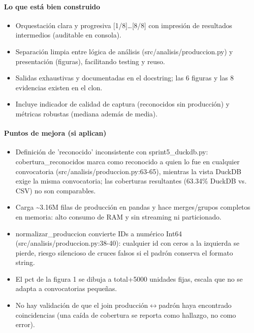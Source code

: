 \paragraph{Lo que está bien construido}
\begin{itemize}
  \item Orquestación clara y progresiva [1/8]\dots{}[8/8] con impresión de resultados intermedios (auditable en consola).
  \item Separación limpia entre lógica de análisis (src/analisis/produccion.py) y presentación (figuras), facilitando testing y reuso.
  \item Salidas exhaustivas y documentadas en el docstring; las 6 figuras y las 8 evidencias existen en el clon.
  \item Incluye indicador de calidad de captura (reconocidos sin producción) y métricas robustas (mediana además de media).
\end{itemize}

\paragraph{Puntos de mejora (si aplican)}
\begin{itemize}
  \item Definición de 'reconocido' inconsistente con sprint5\_duckdb.py: cobertura\_reconocidos marca como reconocido a quien lo fue en cualquier convocatoria (src/analisis/produccion.py:63-65), mientras la vista DuckDB exige la misma convocatoria; las coberturas resultantes (63.34\% DuckDB vs. CSV) no son comparables.
  \item Carga \textasciitilde{}3.16M filas de producción en pandas y hace merges/grupos completos en memoria: alto consumo de RAM y sin streaming ni particionado.
  \item normalizar\_produccion convierte IDs a numérico Int64 (src/analisis/produccion.py:38-40): cualquier id con ceros a la izquierda se pierde, riesgo silencioso de cruces falsos si el padrón conserva el formato string.
  \item El pct de la figura 1 se dibuja a total+5000 unidades fijas, escala que no se adapta a convocatorias pequeñas.
  \item No hay validación de que el join producción$\leftrightarrow$padrón haya encontrado coincidencias (una caída de cobertura se reporta como hallazgo, no como error).
\end{itemize}

